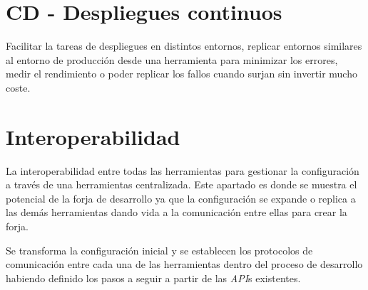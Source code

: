 
\section{CD - Despliegues continuos}
\label{sec:despliegues-continuos}

\par Facilitar la tareas de despliegues en distintos entornos, replicar entornos similares al entorno de producción desde una herramienta para minimizar los errores, medir el rendimiento o poder replicar los fallos cuando surjan sin invertir mucho coste.


\section{Interoperabilidad}
\label{sec:interoperabilidad}

\par La interoperabilidad entre todas las herramientas para gestionar la configuración a través de una herramientas centralizada. Este apartado es donde se muestra el potencial de la forja de desarrollo ya que la configuración se expande o replica a las demás herramientas dando vida a la comunicación entre ellas para crear la forja.

\par Se transforma la configuración inicial y se establecen los protocolos de comunicación entre cada una de las herramientas dentro del proceso de desarrollo habiendo definido los pasos a seguir a partir de las \emph{API}s existentes.

